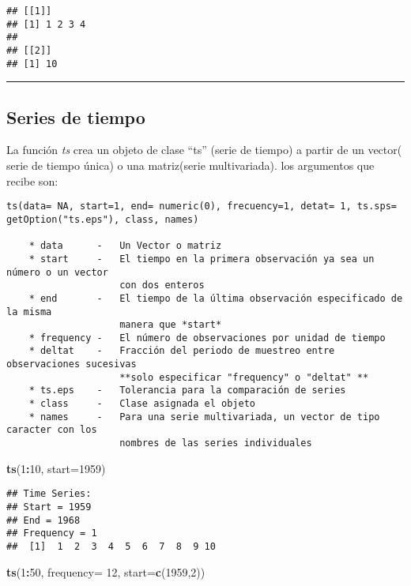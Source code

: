 \documentclass[11pt,]{article}
\newenvironment{Shaded}{\begin{snugshade}}{\end{snugshade}}
\newcommand{\DataTypeTok}[1]{\textcolor[rgb]{0.13,0.29,0.53}{#1}}
\newcommand{\DecValTok}[1]{\textcolor[rgb]{0.00,0.00,0.81}{#1}}
\newcommand{\KeywordTok}[1]{\textcolor[rgb]{0.13,0.29,0.53}{\textbf{#1}}}
\newcommand{\NormalTok}[1]{#1}
\newcommand{\OperatorTok}[1]{\textcolor[rgb]{0.81,0.36,0.00}{\textbf{#1}}}
\begin{document}
\begin{verbatim}
## [[1]]
## [1] 1 2 3 4
## 
## [[2]]
## [1] 10
\end{verbatim}

\begin{center}\rule{0.5\linewidth}{0.5pt}\end{center}

\hypertarget{series-de-tiempo}{%
\subsection{Series de tiempo}\label{series-de-tiempo}}

La función \emph{ts} crea un objeto de clase ``ts'' (serie de tiempo) a
partir de un vector( serie de tiempo única) o una matriz(serie
multivariada). los argumentos que recibe son:

\begin{verbatim}
ts(data= NA, start=1, end= numeric(0), frecuency=1, detat= 1, ts.sps= 
getOption("ts.eps"), class, names)

    * data      -   Un Vector o matriz
    * start     -   El tiempo en la primera observación ya sea un número o un vector
                    con dos enteros
    * end       -   El tiempo de la última observación especificado de la misma 
                    manera que *start*
    * frequency -   El número de observaciones por unidad de tiempo
    * deltat    -   Fracción del periodo de muestreo entre observaciones sucesivas 
                    **solo especificar "frequency" o "deltat" **   
    * ts.eps    -   Tolerancia para la comparación de series
    * class     -   Clase asignada el objeto
    * names     -   Para una serie multivariada, un vector de tipo caracter con los
                    nombres de las series individuales
\end{verbatim}

\begin{Shaded}
\begin{Highlighting}[]
\KeywordTok{ts}\NormalTok{(}\DecValTok{1}\OperatorTok{:}\DecValTok{10}\NormalTok{, }\DataTypeTok{start=}\DecValTok{1959}\NormalTok{)}
\end{Highlighting}
\end{Shaded}

\begin{verbatim}
## Time Series:
## Start = 1959 
## End = 1968 
## Frequency = 1 
##  [1]  1  2  3  4  5  6  7  8  9 10
\end{verbatim}

\begin{Shaded}
\begin{Highlighting}[]
\KeywordTok{ts}\NormalTok{(}\DecValTok{1}\OperatorTok{:}\DecValTok{50}\NormalTok{, }\DataTypeTok{frequency=} \DecValTok{12}\NormalTok{, }\DataTypeTok{start=}\KeywordTok{c}\NormalTok{(}\DecValTok{1959}\NormalTok{,}\DecValTok{2}\NormalTok{))}
\end{Highlighting}
\end{Shaded}
\end{document}
